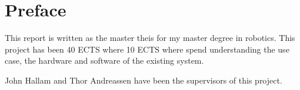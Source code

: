 {\let\clearpage\relax\chapter*{Preface}}
This report is written as the master theis for my master degree in robotics. This project has been 40 ECTS where 10 ECTS where spend understanding the use case, the hardware and software of the existing system.

John Hallam and Thor Andreassen have been the supervisors of this project.

